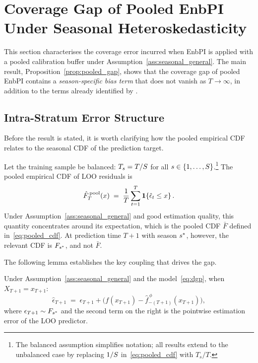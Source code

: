 \section{Coverage Gap of Pooled EnbPI Under Seasonal
         Heteroskedasticity}
\label{sec:pooled_gap}

This section characterises the coverage error incurred when EnbPI is
applied with a pooled calibration buffer under
Assumption~\ref{ass:seasonal_general}.  The main result,
Proposition~\ref{prop:pooled_gap}, shows that the coverage gap of
pooled EnbPI contains a \emph{season-specific bias term} that does
not vanish as $T \to \infty$, in addition to the terms already
identified by \citet{xu2023conformal}.

\subsection{Intra-Stratum Error Structure}
\label{sec:pooled_gap:structure}

Before the result is stated, it is worth clarifying how the pooled
empirical CDF relates to the seasonal CDF of the prediction target.

Let the training sample be balanced: $T_s = T/S$ for all
$s \in \{1,\ldots,S\}$.\footnote{The balanced assumption
simplifies notation; all results extend to the unbalanced case
by replacing $1/S$ in~\eqref{eq:pooled_cdf} with $T_s/T$.}
The pooled empirical CDF of LOO residuals is
\[
  \hat{F}_T^{\,\text{pool}}(x)
  \;=\;
  \frac{1}{T}\sum_{t=1}^T \mathbf{1}\!\left\{\hat{\epsilon}_t \leq x\right\}.
\]
Under Assumption~\ref{ass:seasonal_general} and good estimation quality, this
quantity concentrates around its expectation, which is the pooled CDF
$\bar{F}$ defined in~\eqref{eq:pooled_cdf}.  At prediction time
$T+1$ with season $s^*$, however, the relevant CDF is $F_{s^*}$,
and not $\bar{F}$.

The following lemma establishes the key coupling that drives the gap.

\begin{lemma}
\label{lem:coupling}
Under Assumption~\ref{ass:seasonal_general} and the model~\eqref{eq:dgp},
when $X_{T+1} = x_{T+1}$:
\begin{equation}
  \label{eq:coupling}
  \hat{\epsilon}_{T+1}
  \;=\;
  \epsilon_{T+1}
  + \bigl(f(x_{T+1}) - \hat{f}_{-(T+1)}^{\,\phi}(x_{T+1})\bigr),
\end{equation}
where $\epsilon_{T+1} \sim F_{s^*}$ and the second term on the
right is the pointwise estimation error of the LOO predictor.
\end{lemma}

